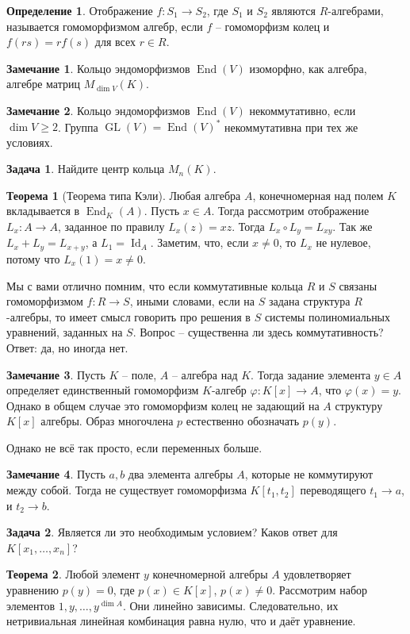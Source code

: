 \documentclass[10pt,a4paper,oneside]{book} %
\theoremstyle{definition}
\newtheorem*{rem}{Замечание}
\newtheorem{zad}{Задача}
\newtheorem*{defn}{Определение}
\newtheorem{thm}{Теорема}
\newcommand{\id}{\operatorname{Id}}
\newcommand{\End}{\operatorname{End}}
\newcommand{\GL}{\operatorname{GL}}
\def\ffi{\varphi}
\def\thrm{\begin{thm}}
\def\ethrm{\end{thm}}
\def\dfn{\begin{defn}}
\def\edfn{\end{defn}}
\def\zd{\begin{zad}}
\def\ezd{\end{zad}}
\def\rm{\begin{rem}}
\def\erm{\end{rem}}
\begin{document}
\dfn Отображение $f \colon S_1 \to S_2$, где $S_1$ и $S_2$ являются $R$-алгебрами,
называется гомоморфизмом алгебр, если $f$ -- гомоморфизм колец и $f(rs)=rf(s)$ для всех $r \in R$.
\edfn



\rm Кольцо эндоморфизмов $\End(V)$  изоморфно, как алгебра, алгебре матриц $M_{\dim V}(K)$.
\erm

\rm Кольцо эндоморфизмов $\End(V)$ некоммутативно, если $\dim V \geq 2$. Группа $\GL(V)=\End(V)^*$ некоммутативна при тех же условиях.
\erm

\zd Найдите центр кольца $M_n(K)$.
\ezd






\thrm[Теорема типа Кэли] Любая алгебра $A$, конечномерная над полем $K$ вкладывается в $\End_K(A)$.
\proof Пусть $x\in A$. Тогда рассмотрим отображение $L_x \colon A \to A$, заданное по правилу $L_x(z)=xz$. Тогда $L_x\circ L_y=L_{xy}$. Так же $L_x+L_y=L_{x+y}$, а $L_1=\id_A$. Заметим, что, если $x\neq 0$, то $L_x$ не нулевое, потому что $L_x(1)=x\neq 0$.
\endproof
\ethrm

Мы с вами отлично помним, что если коммутативные кольца $R$ и $S$ связаны гомоморфизмом $f\colon R \to S$, иными словами, если на $S$ задана структура $R$-алгебры, то имеет смысл говорить про решения в $S$ системы полиномиальных уравнений, заданных на $S$. Вопрос -- существенна ли здесь коммутативность? Ответ: да, но иногда нет.

\rm
Пусть $K$ -- поле, $A$ -- алгебра над $K$. Тогда задание элемента $y \in A$ определяет единственный гомоморфизм $K$-алгебр $\ffi \colon K[x]\to A$, что $\ffi(x)= y$. Однако в общем случае это  гомоморфизм колец не задающий на $A$ структуру $K[x]$ алгебры. Образ многочлена $p$ естественно обозначать $p(y)$.
\erm

Однако не всё так просто, если переменных больше.

\rm Пусть $a,b$ два элемента алгебры $A$, которые не коммутируют между собой. Тогда не существует гомоморфизма $K[t_1,t_2]$ переводящего $t_1\to a$, и $t_2 \to b$.
\erm

\zd Является ли это необходимым условием? Каков ответ для $K[x_1,\dots,x_n]$?
\ezd




\thrm Любой элемент $y$ конечномерной алгебры $A$ удовлетворяет уравнению $p(y)=0$, где $p(x)\in K[x]$, $p(x)\neq 0$.
\proof Рассмотрим набор элементов $1,y,\dots, y^{\dim A}$. Они линейно зависимы. Следовательно, их нетривиальная линейная комбинация равна нулю, что и даёт уравнение.
\endproof
\ethrm
\end{document}
